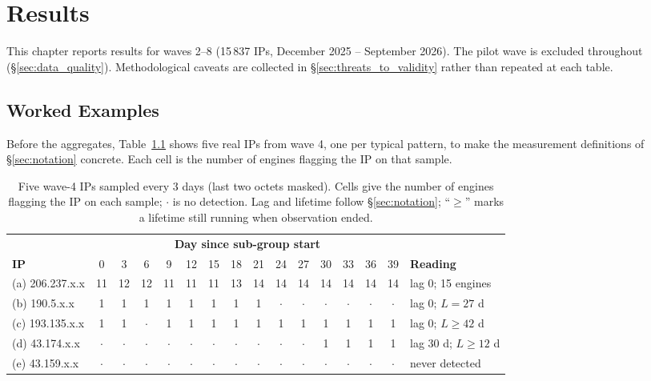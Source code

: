 \chapter{Results}
\label{ch:results}

This chapter reports results for waves 2--8 (15\,837 IPs, December 2025 -- September 2026). The
pilot wave is excluded throughout (\S\ref{sec:data_quality}). Methodological caveats are collected in
\S\ref{sec:threats_to_validity} rather than repeated at each table.

\section{Worked Examples}
\label{sec:examples}

Before the aggregates, Table~\ref{tab:examples} shows five real IPs from wave 4, one per typical
pattern, to make the measurement definitions of \S\ref{sec:notation} concrete. Each cell is the
number of engines flagging the IP on that sample.

\begin{table}[h]
  \centering
  \caption{Five wave-4 IPs sampled every 3 days (last two octets masked). Cells give the number of
    engines flagging the IP on each sample; $\cdot$ is no detection. Lag and lifetime follow
    \S\ref{sec:notation}; ``$\geq$'' marks a lifetime still running when observation ended.}
  \label{tab:examples}
  \footnotesize
  \setlength{\tabcolsep}{2.6pt}
  \begin{tabular}{l*{14}{c}l}
    \toprule
    & \multicolumn{14}{c}{\textbf{Day since sub-group start}} & \\
    \cmidrule(lr){2-15}
    \textbf{IP} & 0 & 3 & 6 & 9 & 12 & 15 & 18 & 21 & 24 & 27 & 30 & 33 & 36 & 39 & \textbf{Reading} \\
    \midrule
    (a) 206.237.x.x & 11 & 12 & 12 & 11 & 11 & 11 & 13 & 14 & 14 & 14 & 14 & 14 & 14 & 14 & lag 0; 15 engines \\
    (b) 190.5.x.x   & 1 & 1 & 1 & 1 & 1 & 1 & 1 & 1 & $\cdot$ & $\cdot$ & $\cdot$ & $\cdot$ & $\cdot$ & $\cdot$ & lag 0; $L = 27$ d \\
    (c) 193.135.x.x & 1 & 1 & $\cdot$ & 1 & 1 & 1 & 1 & 1 & 1 & 1 & 1 & 1 & 1 & 1 & lag 0; $L \geq 42$ d \\
    (d) 43.174.x.x  & $\cdot$ & $\cdot$ & $\cdot$ & $\cdot$ & $\cdot$ & $\cdot$ & $\cdot$ & $\cdot$ & $\cdot$ & $\cdot$ & 1 & 1 & 1 & 1 & lag 30 d; $L \geq 12$ d \\
    (e) 43.159.x.x  & $\cdot$ & $\cdot$ & $\cdot$ & $\cdot$ & $\cdot$ & $\cdot$ & $\cdot$ & $\cdot$ & $\cdot$ & $\cdot$ & $\cdot$ & $\cdot$ & $\cdot$ & $\cdot$ & never detected \\
    \bottomrule
  \end{tabular}
\end{table}

